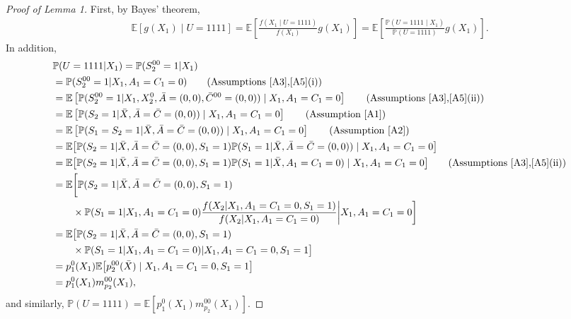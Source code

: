 \documentclass{article}
\newcommand{\pr}{\mathbb{P}}
\newcommand{\E}{\mathbb{E}}
\begin{document}
\begin{proof}[Proof of Lemma 1]
	First, by Bayes' theorem,
\begin{align*}
	\mathbb E[g(X_1) \mid U=1111] = \mathbb E\left[\frac{f(X_1 \mid U=1111)}{f(X_1)} g(X_1)\right] = \mathbb E\left[ \frac{\pr(U=1111 \mid X_1)}{\pr(U=1111)} g(X_1) \right].
\end{align*}
In addition,
\begin{align*}
	&\pr(U=1111 | X_1) 
	 = \pr(S_2^{00} = 1 | X_1) \\
	&= \pr(S_2^{00}=1 | X_1, A_1=C_1=0)  \tag{Assumptions \ref{A3},\ref{A5}(i)}\\%
	&= \mathbb E\left[  \pr(S_2^{00}=1 | X_1, X_2^0, \bar A=(0,0), \bar C^{00}=(0,0)) \mid X_1, A_1=C_1=0  \right]  \tag{Assumptions \ref{A3},\ref{A5}(ii)}\\%
	&= \mathbb E\left[  \pr(S_2=1 | \bar X, \bar A=\bar C=(0,0)) \mid X_1, A_1=C_1=0  \right]  \tag{Assumption \ref{A1}}\\%
	&= \mathbb E\left[  \pr(S_1=S_2=1 | \bar X, \bar A=\bar C=(0,0)) \mid X_1, A_1=C_1=0  \right]  \tag{Assumption \ref{A2}}\\%
	&= \mathbb E\big[  \pr(S_2=1 | \bar X, \bar A=\bar C=(0,0), S_1=1) 
	   \pr(S_1=1 | \bar X, \bar A=\bar C=(0,0)) \mid X_1, A_1=C_1=0  \big]  \\ %
	&= \mathbb E\big[  \pr(S_2=1 | \bar X, \bar A=\bar C=(0,0), S_1=1) 
	   \pr(S_1=1 | \bar X, A_1=C_1=0) \mid X_1, A_1=C_1=0  \big] \tag{Assumptions \ref{A3},\ref{A5}(ii)} \\
	&= \mathbb E\bigg[  \pr(S_2=1 | \bar X, \bar A=\bar C=(0,0), S_1=1) \\
	   &\qquad \times \pr(S_1=1|X_1,A_1=C_1=0) \frac{f(X_2|X_1,A_1=C_1=0,S_1=1)}{f(X_2|X_1,A_1=C_1=0)}
	     \bigg| X_1, A_1=C_1=0  \bigg] \\
	&= \mathbb E\big[  \pr(S_2=1 | \bar X, \bar A=\bar C=(0,0), S_1=1)  \\
	   &\qquad \times \pr(S_1=1 | X_1, A_1=C_1=0) | X_1, A_1=C_1=0, S_1=1  \big] \\%
	&= p_1^0(X_1) \E\big[ p_2^{00}(\bar X) \mid X_1, A_1=C_1=0, S_1=1  \big] \\
	&= p_1^0(X_1) m_{p_2}^{00}(X_1),   %
\end{align*}
and similarly, $\pr(U=1111) = \mathbb E\left[ p_1^0(X_1) m_{p_2}^{00}(X_1) \right]$. 
\end{proof}
\end{document}
